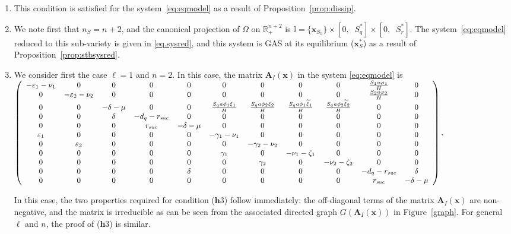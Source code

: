 \documentclass[a4paper]{article}
\begin{document}
\begin{enumerate}[({\bf h}1)]
\item 
This condition  is satisfied for the system~\eqref{eq:eqmodel} as a result of Proposition~\ref{prop:dissip}. 
\item
We note first that $n_S = n+2$, and the canonical projection of $\Omega$ on $\mathbb R_+^{n+2}$ is $\mathbb I = \{\mathbf x_{S_h}\}\times\left [0,\;\;S^*_q\right]\times \left [0,\;\;S^*_r\right]$. The system~\eqref{eq:eqmodel} reduced to this sub-variety is given in \eqref{eq.sysred}, and this system is GAS at its equilibrium ($\mathbf x^*_S$) as a result of  Proposition~\ref{prop:stbsysred}. 

\item
 We consider first the case $\ell=1$ and $n=2$. In this case, the matrix  $\mathbf A_I(\mathbf x)$ in the system \eqref{eq:eqmodel} is\\ $\small\left(\begin{array}{cccccccccccc}
 -\varepsilon_{1} - \nu_{1} & 0 & 0 & 0 & 0 & 0 & 0 & 0 & 0 & \frac{S_{1} a \varphi_{1}}{H} & 0 \\
 0 & -\varepsilon_{2} - \nu_{2} & 0 & 0 & 0 & 0 & 0 & 0 & 0 & \frac{S_{2} a \varphi_{2}}{H} & 0 \\
 0 & 0 & -\delta - \mu & 0 & 0 & \frac{S_{q} a \phi_{1} \xi_{1}}{H} & \frac{S_{q} a \phi_{2} \xi_{2}}{H} & \frac{S_{q} a \phi_{1}\widetilde\xi_1}{H} & \frac{S_{q} a\phi_{2}\widetilde  \xi_{2} }{H} & 0 & 0 \\
 0 & 0 & \delta & -d_{q} - r_{\mathit{suc}} & 0 & 0 & 0 & 0 & 0 & 0 & 0 \\
 0 & 0 & 0 & r_{\mathit{suc}} & -\delta - \mu & 0 & 0 & 0 & 0 & 0 & 0 \\
 \varepsilon_{1} & 0 & 0 & 0 & 0 & -\gamma_{1} - \nu_{1} & 0 & 0 & 0 & 0 & 0 \\
 0 & \varepsilon_{2} & 0 & 0 & 0 & 0 & -\gamma_{2} - \nu_{2} & 0 & 0 & 0 & 0 \\
 0 & 0 & 0 & 0 & 0 & \gamma_{1} & 0 & -\nu_{1} - \zeta_{1} & 0 & 0 & 0 \\
 0 & 0 & 0 & 0 & 0 & 0 & \gamma_{2} & 0 & -\nu_{2} - \zeta_{2} & 0 & 0 \\
 0 & 0 & 0 & 0 & \delta & 0 & 0 & 0 & 0 & -d_{q} - r_{\mathit{suc}} & \delta \\
 0 & 0 & 0 & 0 & 0 & 0 & 0 & 0 & 0 & r_{\mathit{suc}} & -\delta - \mu
 \end{array}\right).$ 

In this case, the two properties required for condition ($\mathbf h3$) follow immediately: the off-diagonal terms of the matrix   $\mathbf A_I(\mathbf x)$ are non-negative, and  the matrix is irreducible as can be seen from the associated directed graph $G(\mathbf A_I(\mathbf x))$ in Figure~\ref{graph}. 
For general $\ell$ and $n$, the proof of ({\bf h}3) is similar.


\end{enumerate}
\end{document}
